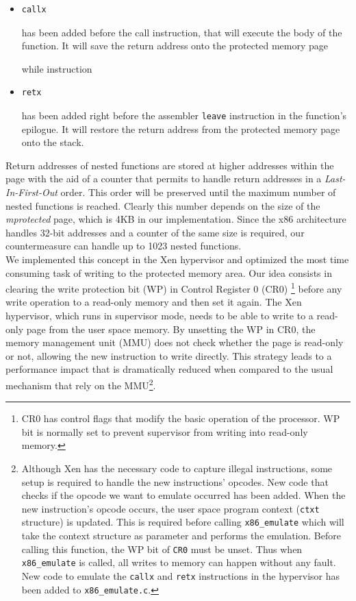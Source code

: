\begin{itemize}
\item 
\begin{verbatim}
callx
\end{verbatim}

has been added before the call instruction, that will execute the body of the function. It will save the return address onto the protected memory page

while instruction 
\item 
\begin{verbatim}
retx
\end{verbatim}
has been added right before the assembler \texttt{leave} instruction in the function's epilogue. It will restore the return address from the protected memory page onto the stack.
\end{itemize}

Return addresses of nested functions are stored at higher addresses within the page with the aid of a counter that permits to handle return addresses in a \emph{Last-In-First-Out} order. This order will be preserved until the maximum number of nested functions is reached. Clearly this number depends on the size of the \emph{mprotected} page, which is 4KB in our implementation. Since the x86 architecture handles 32-bit addresses and a counter of the same size is required, our countermeasure can handle up to 1023 nested functions.\\

We implemented this concept in the Xen hypervisor \cite{xen} and optimized the most time consuming task of writing to the protected memory area. Our idea consists in clearing the write protection bit (WP) in Control Register 0 (CR0) \footnote{CR0 has control flags that modify the basic operation of the processor. WP bit is normally set to prevent supervisor from writing into read-only memory.} before any write operation to a read-only memory and then set it again. 
The Xen hypervisor, which runs in supervisor mode, needs to be able to write to a read-only page from the user space memory. By unsetting the WP in CR0, the memory management unit (MMU) does not check whether the page is read-only or not, allowing the new instruction to write directly. This strategy leads to a performance impact that is dramatically reduced when compared to the usual mechanism that rely on the MMU\footnote{Although Xen has the necessary code to capture illegal instructions, some setup is required to handle the new instructions' opcodes. New code that checks if the opcode we want to emulate occurred has been added. When the new instruction's opcode occurs, the user space program context (\texttt{ctxt} structure) is updated. This is required before calling \texttt{x86\_emulate} which will take the context structure as parameter and performs the emulation.  Before calling this function, the WP bit of \texttt{CR0} must be unset. Thus when \texttt{x86\_emulate} is called, all writes to memory can happen without any fault. New code to emulate the \texttt{callx} and \texttt{retx} instructions in the hypervisor  has been added to \texttt{x86\_emulate.c}.}. 

